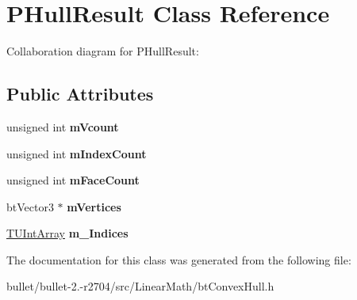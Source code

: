 \hypertarget{class_p_hull_result}{\section{P\+Hull\+Result Class Reference}
\label{class_p_hull_result}
}


Collaboration diagram for P\+Hull\+Result\+:
\subsection*{Public Attributes}
\begin{DoxyCompactItemize}
\item 
\hypertarget{class_p_hull_result_a50e0822115efee52ac33615a1a859833}{unsigned int {\bfseries m\+Vcount}}\label{class_p_hull_result_a50e0822115efee52ac33615a1a859833}

\item 
\hypertarget{class_p_hull_result_a809b09d377bec9ce09b9057dc07b6ff0}{unsigned int {\bfseries m\+Index\+Count}}\label{class_p_hull_result_a809b09d377bec9ce09b9057dc07b6ff0}

\item 
\hypertarget{class_p_hull_result_a0b192809f9a774b503c6bd4bea3f4125}{unsigned int {\bfseries m\+Face\+Count}}\label{class_p_hull_result_a0b192809f9a774b503c6bd4bea3f4125}

\item 
\hypertarget{class_p_hull_result_aafa609ab9eb140c6ead57fae107d9961}{bt\+Vector3 $\ast$ {\bfseries m\+Vertices}}\label{class_p_hull_result_aafa609ab9eb140c6ead57fae107d9961}

\item 
\hypertarget{class_p_hull_result_ab1c631b0d6787bc1c63fbe4aa118e30a}{\hyperlink{classbt_aligned_object_array}{T\+U\+Int\+Array} {\bfseries m\+\_\+\+Indices}}\label{class_p_hull_result_ab1c631b0d6787bc1c63fbe4aa118e30a}

\end{DoxyCompactItemize}


The documentation for this class was generated from the following file\+:\begin{DoxyCompactItemize}
\item 
bullet/bullet-\/2.-\/r2704/src/\+Linear\+Math/bt\+Convex\+Hull.\+h\end{DoxyCompactItemize}
